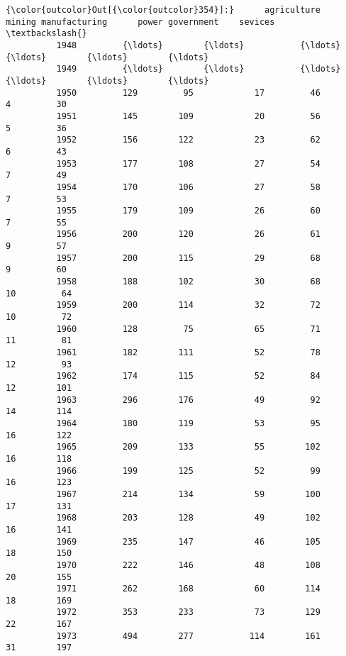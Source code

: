 \documentclass[11pt]{article}
\begin{document}
\begin{Verbatim}[commandchars=\\\{\}]
{\color{outcolor}Out[{\color{outcolor}354}]:}      agriculture     mining manufacturing      power government    sevices  \textbackslash{}
          1948         {\ldots}        {\ldots}           {\ldots}        {\ldots}        {\ldots}        {\ldots}   
          1949         {\ldots}        {\ldots}           {\ldots}        {\ldots}        {\ldots}        {\ldots}   
          1950         129         95            17         46          4         30   
          1951         145        109            20         56          5         36   
          1952         156        122            23         62          6         43   
          1953         177        108            27         54          7         49   
          1954         170        106            27         58          7         53   
          1955         179        109            26         60          7         55   
          1956         200        120            26         61          9         57   
          1957         200        115            29         68          9         60   
          1958         188        102            30         68         10         64   
          1959         200        114            32         72         10         72   
          1960         128         75            65         71         11         81   
          1961         182        111            52         78         12         93   
          1962         174        115            52         84         12        101   
          1963         296        176            49         92         14        114   
          1964         180        119            53         95         16        122   
          1965         209        133            55        102         16        118   
          1966         199        125            52         99         16        123   
          1967         214        134            59        100         17        131   
          1968         203        128            49        102         16        141   
          1969         235        147            46        105         18        150   
          1970         222        146            48        108         20        155   
          1971         262        168            60        114         18        169   
          1972         353        233            73        129         22        167   
          1973         494        277           114        161         31        197   

\end{Verbatim}
\end{document}
